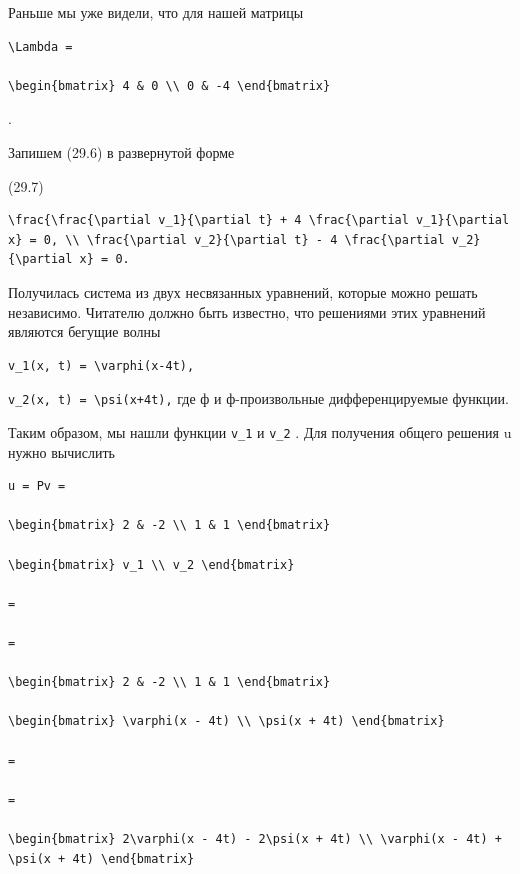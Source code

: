 \documentclass[
  ukrainian,
]{article}
\begin{document}
Раньше мы уже видели, что для нашей матрицы

\begin{verbatim}
\Lambda =

\begin{bmatrix} 4 & 0 \\ 0 & -4 \end{bmatrix}
\end{verbatim}

.

Запишем (29.6) в развернутой форме

(29.7)

\begin{verbatim}
\frac{\frac{\partial v_1}{\partial t} + 4 \frac{\partial v_1}{\partial x} = 0, \\ \frac{\partial v_2}{\partial t} - 4 \frac{\partial v_2}{\partial x} = 0.
\end{verbatim}

Получилась система из двух несвязанных уравнений, которые можно решать
независимо. Читателю должно быть известно, что решениями этих уравнений
являются бегущие волны

\begin{verbatim}
v_1(x, t) = \varphi(x-4t),
\end{verbatim}

\texttt{v\_2(x,\ t)\ =\ \textbackslash{}psi(x+4t),} где ф и
ф-произвольные дифференцируемые функции.

Таким образом, мы нашли функции \texttt{v\_1} и \texttt{v\_2} . Для
получения общего решения u нужно вычислить

\begin{verbatim}
u = Pv =

\begin{bmatrix} 2 & -2 \\ 1 & 1 \end{bmatrix}

\begin{bmatrix} v_1 \\ v_2 \end{bmatrix}

=

=

\begin{bmatrix} 2 & -2 \\ 1 & 1 \end{bmatrix}

\begin{bmatrix} \varphi(x - 4t) \\ \psi(x + 4t) \end{bmatrix}

=

=

\begin{bmatrix} 2\varphi(x - 4t) - 2\psi(x + 4t) \\ \varphi(x - 4t) + \psi(x + 4t) \end{bmatrix}
\end{verbatim}
\end{document}
